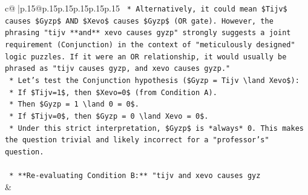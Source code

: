 \documentclass{article}
\begin{document}
{\begin{supertabular}{c@{$\;$}|p{.15\linewidth}@{}p{.15\linewidth}p{.15\linewidth}p{.15\linewidth}p{.15\linewidth}p{.15\linewidth}}
{{{\texttt{        *   Alternatively, it could mean \$Tijv\$ causes \$Gyzp\$ AND \$Xevo\$ causes \$Gyzp\$ (OR gate). However, the phrasing "tijv **and** xevo causes gyzp" strongly suggests a joint requirement (Conjunction) in the context of "meticulously designed" logic puzzles. If it were an OR relationship, it would usually be phrased as "tijv causes gyzp, and xevo causes gyzp."} \\
\texttt{        *   Let's test the Conjunction hypothesis (\$Gyzp = Tijv \textbackslash{}land Xevo\$):} \\
\texttt{            *   If \$Tijv=1\$, then \$Xevo=0\$ (from Condition A).} \\
\texttt{            *   Then \$Gyzp = 1 \textbackslash{}land 0 = 0\$.} \\
\texttt{            *   If \$Tijv=0\$, then \$Gyzp = 0 \textbackslash{}land Xevo = 0\$.} \\
\texttt{            *   Under this strict interpretation, \$Gyzp\$ is *always* 0. This makes the question trivial and likely incorrect for a "professor's" question.} \\
\\ 
\texttt{    *   **Re{-}evaluating Condition B:** "tijv and xevo causes gyz} \\
            }
        }
    }
    & \\ \\


\end{supertabular}}
\end{document}
